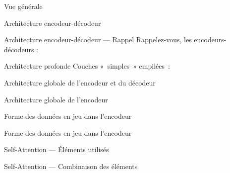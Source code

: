 
\begin{frame}{Vue générale}
\end{frame}

\begin{frame}{Architecture encodeur-décodeur}
\end{frame}

\begin{frame}{Architecture encodeur-décodeur --- Rappel}
  Rappelez-vous, les encodeurs-décodeurs :
\end{frame}

\begin{frame}{Architecture profonde}
  Couches «~simples~» empilées~:
\end{frame}

\begin{frame}{Architecture globale de l'encodeur et du décodeur}
\end{frame}

\begin{frame}{Architecture globale de l'encodeur}
\end{frame}

\begin{frame}{Forme des données en jeu dans l'encodeur}
\end{frame}

\begin{frame}{Forme des données en jeu dans l'encodeur}
\end{frame}

\begin{frame}{Self-Attention --- Éléments utilisés}
\end{frame}

\begin{frame}{Self-Attention --- Combinaison des éléments}
\end{frame}

